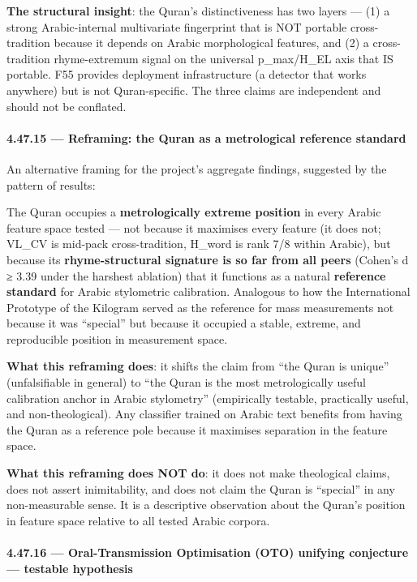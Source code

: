 \documentclass[
]{article}
\begin{document}
\textbf{The structural insight}: the Quran's distinctiveness has two
layers --- (1) a strong Arabic-internal multivariate fingerprint that is
NOT portable cross-tradition because it depends on Arabic morphological
features, and (2) a cross-tradition rhyme-extremum signal on the
universal p\_max/H\_EL axis that IS portable. F55 provides deployment
infrastructure (a detector that works anywhere) but is not
Quran-specific. The three claims are independent and should not be
conflated.

\paragraph{4.47.15 --- Reframing: the Quran as a metrological reference
standard}\label{reframing-the-quran-as-a-metrological-reference-standard}

An alternative framing for the project's aggregate findings, suggested
by the pattern of results:

The Quran occupies a \textbf{metrologically extreme position} in every
Arabic feature space tested --- not because it maximises every feature
(it does not; VL\_CV is mid-pack cross-tradition, H\_word is rank 7/8
within Arabic), but because its \textbf{rhyme-structural signature is so
far from all peers} (Cohen's d ≥ 3.39 under the harshest ablation) that
it functions as a natural \textbf{reference standard} for Arabic
stylometric calibration. Analogous to how the International Prototype of
the Kilogram served as the reference for mass measurements not because
it was ``special'' but because it occupied a stable, extreme, and
reproducible position in measurement space.

\textbf{What this reframing does}: it shifts the claim from ``the Quran
is unique'' (unfalsifiable in general) to ``the Quran is the most
metrologically useful calibration anchor in Arabic stylometry''
(empirically testable, practically useful, and non-theological). Any
classifier trained on Arabic text benefits from having the Quran as a
reference pole because it maximises separation in the feature space.

\textbf{What this reframing does NOT do}: it does not make theological
claims, does not assert inimitability, and does not claim the Quran is
``special'' in any non-measurable sense. It is a descriptive observation
about the Quran's position in feature space relative to all tested
Arabic corpora.

\paragraph{4.47.16 --- Oral-Transmission Optimisation (OTO) unifying
conjecture --- testable
hypothesis}\label{oral-transmission-optimisation-oto-unifying-conjecture-testable-hypothesis}
\end{document}

